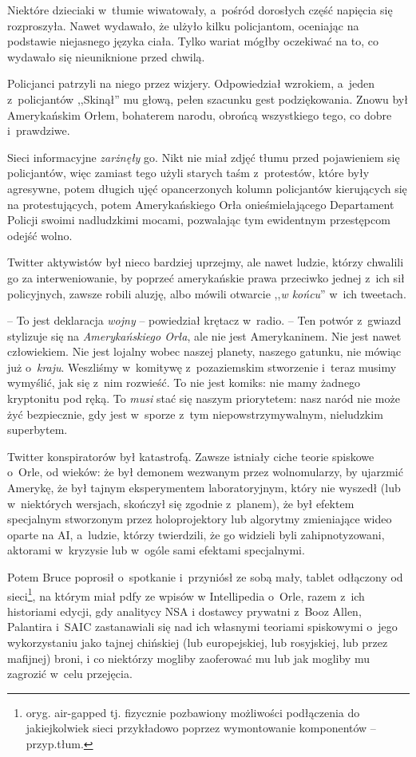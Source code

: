 \documentclass[oneside,polish,11pt,sfheadings]{mwbk}
\begin{document}
Niektóre dzieciaki w~tłumie wiwatowały, a~pośród dorosłych część
napięcia się rozproszyła. Nawet wydawało, że ulżyło kilku policjantom,
oceniając na podstawie niejasnego języka ciała. Tylko wariat mógłby
oczekiwać na to, co wydawało się nieuniknione przed chwilą.

Policjanci patrzyli na niego przez wizjery. Odpowiedział wzrokiem, a~jeden z~policjantów ,,Skinął'' mu głową, pełen szacunku gest
podziękowania. Znowu był Amerykańskim Orłem, bohaterem narodu, obrońcą
wszystkiego tego, co dobre i~prawdziwe.

Sieci informacyjne \textit{zarżnęły} go. Nikt nie miał zdjęć tłumu przed
pojawieniem się policjantów, więc zamiast tego użyli starych taśm z~protestów, które były agresywne, potem długich ujęć opancerzonych kolumn
policjantów kierujących się na protestujących, potem Amerykańskiego Orła
onieśmielającego Departament Policji swoimi nadludzkimi mocami,
pozwalając tym ewidentnym przestępcom odejść wolno.

Twitter aktywistów był nieco bardziej uprzejmy, ale nawet ludzie, którzy
chwalili go za interweniowanie, by poprzeć amerykańskie prawa przeciwko
jednej z~ich sił policyjnych, zawsze robili aluzję, albo mówili otwarcie
,,\textit{w końcu}'' w~ich tweetach.

-- To jest deklaracja \textit{wojny} -- powiedział krętacz w~radio. -- Ten
potwór z~gwiazd stylizuje się na \textit{Amerykańskiego Orła}, ale nie
jest Amerykaninem. Nie jest nawet człowiekiem. Nie jest lojalny wobec
naszej planety, naszego gatunku, nie mówiąc już o~\textit{kraju}.
Weszliśmy w~komitywę z~pozaziemskim stworzenie i~teraz musimy wymyślić,
jak się z~nim rozwieść. To nie jest komiks: nie mamy żadnego kryptonitu
pod ręką. To \textit{musi} stać się naszym priorytetem: nasz naród nie
może żyć bezpiecznie, gdy jest w~sporze z~tym niepowstrzymywalnym,
nieludzkim superbytem.

Twitter konspiratorów był katastrofą. Zawsze istniały ciche teorie
spiskowe o~Orle, od wieków: że był demonem wezwanym przez wolnomularzy,
by ujarzmić Amerykę, że był tajnym eksperymentem laboratoryjnym, który
nie wyszedł (lub w~niektórych wersjach, skończył się zgodnie z~planem),
że był efektem specjalnym stworzonym przez holoprojektory lub algorytmy
zmieniające wideo oparte na AI, a~ludzie, którzy twierdzili, że go
widzieli byli zahipnotyzowani, aktorami w~kryzysie lub w~ogóle sami
efektami specjalnymi.

Potem Bruce poprosił o~spotkanie i~przyniósł ze sobą mały, tablet
odłączony od sieci\footnote{oryg. air-gapped tj. fizycznie pozbawiony
możliwości podłączenia do jakiejkolwiek sieci przykładowo poprzez
wymontowanie komponentów -- przyp.tłum.}, na którym miał pdfy ze wpisów
w Intellipedia o~Orle, razem z~ich historiami edycji, gdy analitycy NSA
i dostawcy prywatni z~Booz Allen, Palantira i~SAIC zastanawiali się nad
ich własnymi teoriami spiskowymi o~jego wykorzystaniu jako tajnej
chińskiej (lub europejskiej, lub rosyjskiej, lub przez mafijnej) broni,
i co niektórzy mogliby zaoferować mu lub jak mogliby mu zagrozić w~celu
przejęcia.
\end{document}
